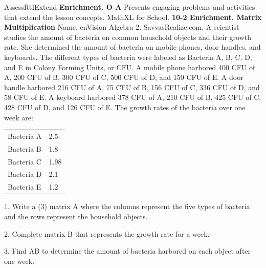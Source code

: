 \documentclass{article}
\newenvironment{te-addendum}[2]{}{}     %
\newcommand{\answer}[1]{}               %
\newcommand{\te}[1]{}                   %
\begin{document}
\begin{te-addendum}{Assess}{RtIExtend}
\textbf{Enrichment. O A}
Presents engaging problems and activities that extend the lesson concepts. MathXL for School.
\textbf{10-2 Enrichment. Matrix Multiplication}
Name. enVision Algebra 2. SavvasRealize.com.
A scientist studies the amount of bacteria on common household objects and their growth rate. She determined the amount of bacteria on mobile phones, door handles, and keyboards. The different types of bacteria were labeled as Bacteria A, B, C, D, and E in Colony Forming Units, or CFU.
A mobile phone harbored 400 CFU of A, 200 CFU of B, 300 CFU of C, 500 CFU of D, and 150 CFU of E.
A door handle harbored 216 CFU of A, 75 CFU of B, 156 CFU of C, 336 CFU of D, and 58 CFU of E.
A keyboard harbored 378 CFU of A, 210 CFU of B, 425 CFU of C, 428 CFU of D, and 126 CFU of E.
The growth rates of the bacteria over one week are:
\begin{tabular}{ll}
Bacteria A & 2.5 \\
Bacteria B & 1.8 \\
Bacteria C & 1.98 \\
Bacteria D & 2.1 \\
Bacteria E & 1.2 \\
\end{tabular}
1. Write a (3) matrix A where the columns represent the five types of bacteria and the rows represent the household objects.
\answer{(A=\begin{bmatrix}400&200&300&500&300\\216&75&156&336&58\\378&210&425&428&126\end{bmatrix})}
\te{Printed first-row last entry is 300; likely 150, as in the prompt and the matrix in item 3.}
2. Complete matrix B that represents the growth rate for a week.
\answer{(B=\begin{bmatrix}2.5\\1.8\\1.98\\2.1\\1.2\end{bmatrix})}
3. Find AB to determine the amount of bacteria harbored on each object after one week.
\answer{(AB=\begin{bmatrix}400&200&300&500&150\\216&75&156&336&58\\378&210&425&428&126\end{bmatrix}\begin{bmatrix}2.5\\1.8\\1.98\\2.1\\1.2\end{bmatrix}=\begin{bmatrix}3184\\1759.08\\3214.5\end{bmatrix})}
\te{enVision Algebra 2 • Teaching Resources. Copyright Savvas Learning Company LLC. All Rights Reserved.}
\end{te-addendum}
\end{document}
